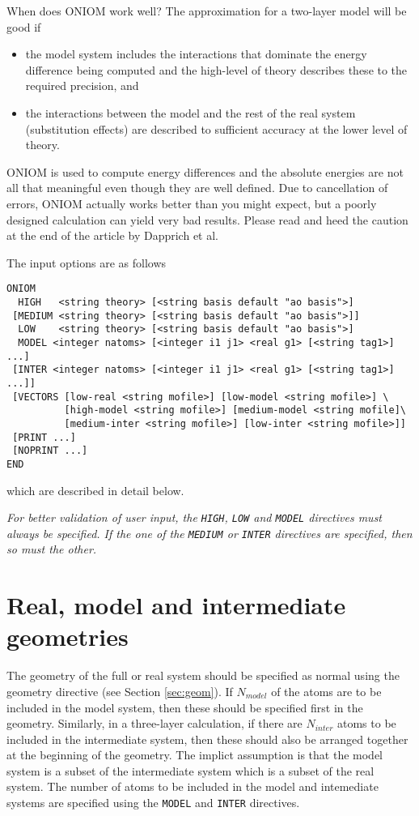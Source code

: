 When does ONIOM work well?  The approximation for a two-layer model
will be good if
\begin{itemize}
\item the model system includes the interactions that dominate the
   energy difference being computed and the high-level of theory
   describes these to the required precision, and
\item the interactions between the model and the rest of the real system
    (substitution effects) are described to sufficient accuracy at the
    lower level of theory.
\end{itemize}
ONIOM is used to compute energy differences and the absolute energies
are not all that meaningful even though they are well defined.  Due to
cancellation of errors, ONIOM actually works better than you might
expect, but a poorly designed calculation can yield very bad results.
Please read and heed the caution at the end of the article by Dapprich
et al.

The input options are as follows
\begin{verbatim}
ONIOM
  HIGH   <string theory> [<string basis default "ao basis">]
 [MEDIUM <string theory> [<string basis default "ao basis">]]
  LOW    <string theory> [<string basis default "ao basis">]
  MODEL <integer natoms> [<integer i1 j1> <real g1> [<string tag1>] ...]
 [INTER <integer natoms> [<integer i1 j1> <real g1> [<string tag1>] ...]]
 [VECTORS [low-real <string mofile>] [low-model <string mofile>] \
          [high-model <string mofile>] [medium-model <string mofile]\
          [medium-inter <string mofile>] [low-inter <string mofile>]]
 [PRINT ...]
 [NOPRINT ...]
END
\end{verbatim}
which are described in detail below.  

{\em  For better validation of user input, the \verb+HIGH+,
\verb+LOW+ and \verb+MODEL+ directives must always be specified.  If
the one of the \verb+MEDIUM+ or \verb+INTER+ directives are specified,
then so must the other.}

\section{Real, model and intermediate geometries}

The geometry of the full or real system should be specified as normal
using the geometry directive (see Section \ref{sec:geom}).  If
$N_{model}$ of the atoms are to be included in the model system, then
these should be specified first in the geometry.  Similarly, in a
three-layer calculation, if there are $N_{inter}$ atoms to be included
in the intermediate system, then these should also be arranged
together at the beginning of the geometry.  The implict assumption is
that the model system is a subset of the intermediate system which is
a subset of the real system.  The number of atoms to be included in
the model and intemediate systems are specified using the \verb+MODEL+
and \verb+INTER+ directives.  

